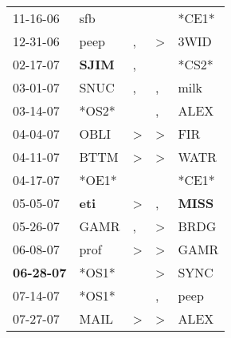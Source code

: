 \begin{supertabular}{p{0.07\textwidth}p{0.06\textwidth}p{0.02\textwidth}p{0.02\textwidth}p{0.06\textwidth}}
          11-16-06\textsuperscript{} &            sfb\textsuperscript{} &                  &                  &                            *CE1* \\
          12-31-06\textsuperscript{} &           peep\textsuperscript{} &                , &     \textgreater &           3WID\textsuperscript{} \\
          02-17-07\textsuperscript{} &  \textbf{SJIM\textsuperscript{}} &                , &                  &                            *CS2* \\
          03-01-07\textsuperscript{} &           SNUC\textsuperscript{} &                , &                , &           milk\textsuperscript{} \\
          03-14-07\textsuperscript{} &                            *OS2* &                  &                , &           ALEX\textsuperscript{} \\
          04-04-07\textsuperscript{} &           OBLI\textsuperscript{} &     \textgreater &     \textgreater &            FIR\textsuperscript{} \\
          04-11-07\textsuperscript{} &           BTTM\textsuperscript{} &     \textgreater &     \textgreater &           WATR\textsuperscript{} \\
          04-17-07\textsuperscript{} &                            *OE1* &                  &                  &                            *CE1* \\
          05-05-07\textsuperscript{} &   \textbf{eti\textsuperscript{}} &     \textgreater &                , &  \textbf{MISS\textsuperscript{}} \\
          05-26-07\textsuperscript{} &           GAMR\textsuperscript{} &                , &     \textgreater &           BRDG\textsuperscript{} \\
          06-08-07\textsuperscript{} &           prof\textsuperscript{} &     \textgreater &     \textgreater &           GAMR\textsuperscript{} \\
 \textbf{06-28-07\textsuperscript{}} &                            *OS1* &                  &     \textgreater &           SYNC\textsuperscript{} \\
          07-14-07\textsuperscript{} &                            *OS1* &                  &                , &           peep\textsuperscript{} \\
          07-27-07\textsuperscript{} &           MAIL\textsuperscript{} &     \textgreater &     \textgreater &           ALEX\textsuperscript{} \\

\end{supertabular}
